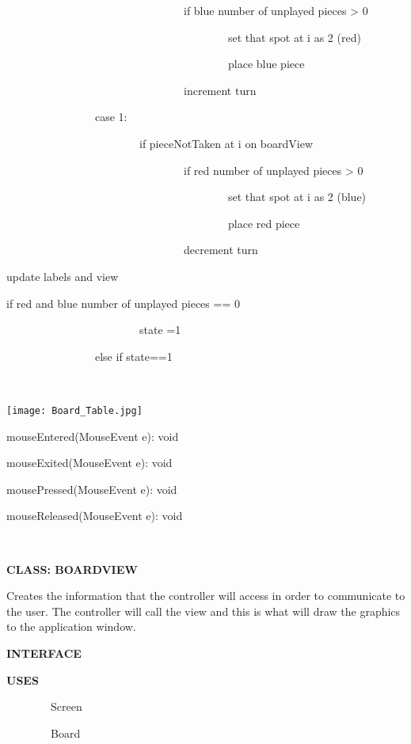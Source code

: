 \documentclass{article}
\begin{document}
{~~~~~~~~~~~~~~~~~~~~~~~~~~~~~~~~if blue number of unplayed pieces
\textgreater{ 0}

{~~~~~~~~~~~~~~~~~~~~~~~~~~~~~~~~~~~~~~~~set that spot at i as 2 (red)}

{~~~~~~~~~~~~~~~~~~~~~~~~~~~~~~~~~~~~~~~~place blue piece}

{~~~~~~~~~~~~~~~~~~~~~~~~~~~~~~~~}{increment turn}

{~~~~~~~~~~~~~~~~case 1:}

{~~~~~~~~~~~~~~~~~~~~~~~~if pieceNotTaken at i on boardView}

{~~~~~~~~~~~~~~~~~~~~~~~~~~~~~~~~if red number of unplayed pieces \textgreater{ 0}}

{~~~~~~~~~~~~~~~~~~~~~~~~~~~~~~~~~~~~~~~~set that spot at i as 2 (blue)}

{~~~~~~~~~~~~~~~~~~~~~~~~~~~~~~~~~~~~~~~~place red piece}

{~~~~~~~~~~~~~~~~~~~~~~~~~~~~~~~~decrement turn}

{update labels and view}

{if red and blue number of unplayed pieces == 0}

{~~~~~~~~~~~~~~~~~~~~~~~~state =1}

{~~~~~~~~~~~~~~~~}{else if state==1 }

{~}

\texttt{[image: Board\_Table.jpg]}
{~}
{}

{}

{mouseEntered(MouseEvent e): void}

{mouseExited(MouseEvent e): void}

{mousePressed(MouseEvent e): void}

{mouseReleased(MouseEvent e): void}

{}

{}

{}

{}

{~~~~~~~~}

{}

{\textbf{CLASS: BOARDVIEW}}

{Creates the information that the controller will access in order to communicate to the user. The controller will call the view and this is what will draw the graphics to the application window.}

{\textbf{INTERFACE}}

{\textbf{USES}}

{~~~~~~~~Screen}

{~~~~~~~~Board}

}
\end{document}

